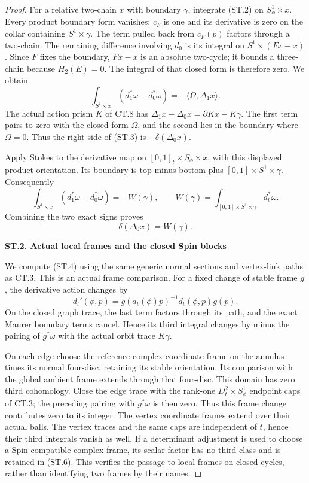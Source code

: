 \begin{proof}
For a relative two-chain \(x\) with boundary \(\gamma\), integrate
(ST.2) on \(S^1_\phi\times x\). Every product boundary form vanishes:
\(c_F\) is one and its derivative is zero on the collar containing
\(S^1\times\gamma\). The term pulled back from \(c_F(p)\) factors
through a two-chain. The remaining difference involving \(d_0\)
is its integral on \(S^1\times(Fx-x)\). Since \(F\) fixes the
boundary, \(Fx-x\) is an absolute two-cycle; it bounds a three-chain
because \(H_2(E)=0\). The integral of that closed form is therefore
zero. We obtain
\[
 \int_{S^1\times x}(d_1^*\omega-d_0^*\omega)
                   =-\langle\Omega,\Delta_1x\rangle. \tag{ST.3}
\]
The actual action prism \(K\) of CT.8 has
\(\Delta_1x-\Delta_0x=\partial Kx-K\gamma\).
The first term pairs to zero with the closed form \(\Omega\), and
the second lies in the boundary where \(\Omega=0\). Thus the
right side of (ST.3) is \(-\delta(\Delta_0x)\).

Apply Stokes to the derivative map on
\([0,1]_t\times S^1_\phi\times x\), with this displayed product
orientation. Its boundary is top minus bottom plus
\([0,1]\times S^1\times\gamma\). Consequently
\[
 \int_{S^1\times x}(d_1^*\omega-d_0^*\omega)
   =-W(\gamma),\qquad
 W(\gamma)=\int_{[0,1]\times S^1\times\gamma}d_t^*\omega.
                                                               \tag{ST.4}
\]
Combining the two exact signs proves
\[
                       \delta(\Delta_0x)=W(\gamma).    \tag{ST.5}
\]

\par

\medskip\noindent\textbf{ST.2. Actual local frames and the closed Spin blocks}

\par\nobreak

We compute (ST.4) using the same generic normal sections and
vertex-link paths as CT.3. This is an actual frame comparison.
For a fixed change of stable frame \(g\), the derivative action
changes by
\[
 d_t'(\phi,p)=g(a_t(\phi)p)^{-1}d_t(\phi,p)g(p).
                                                               \tag{ST.6}
\]
On the closed graph trace, the last term factors through its path,
and the exact Maurer boundary terms cancel. Hence its third
integral changes by minus the pairing of \(g^*\omega\) with the
actual orbit trace \(K\gamma\).

On each edge choose the reference complex coordinate frame on the
annulus times its normal four-disc, retaining its stable orientation.
Its comparison with the global ambient frame extends through that
four-disc. This domain has zero third cohomology. Close the edge
trace with the rank-one \(D^2_t\times S^1_\phi\) endpoint caps of
CT.3; the preceding pairing with \(g^*\omega\) is then zero.
Thus this frame change contributes zero to its integer. The vertex
coordinate frames extend over their actual balls. The vertex traces
and the same caps are independent of \(t\), hence their third
integrals vanish as well. If a determinant adjustment is used to
choose a Spin-compatible complex frame, its scalar factor has no
third class and is retained in (ST.6). This verifies the passage to
local frames on closed cycles, rather than identifying two frames
by their names.


\end{proof}
